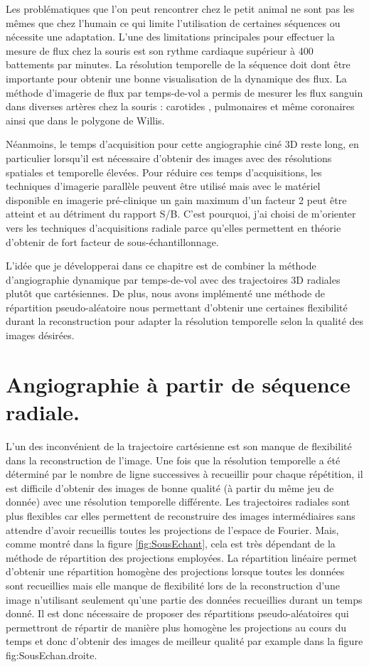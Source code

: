 Les problématiques que l'on peut rencontrer chez le petit animal ne sont pas les mêmes que chez l'humain ce qui limite l'utilisation de certaines séquences ou nécessite une adaptation. L'une des limitations principales pour effectuer la mesure de flux chez la souris est son rythme cardiaque supérieur à 400 battements par minutes. La résolution temporelle de la séquence doit dont être importante pour obtenir une bonne visualisation de la dynamique des flux.
La méthode d'imagerie de flux par temps-de-vol a permis de mesurer les flux sanguin dans diverses artères chez la souris : carotides \cite{Miraux:2006fu}, pulmonaires \cite{Cochet:2013dk} et même coronaires \cite{Cochet:2010ec} ainsi que dans le polygone de Willis.

Néanmoins, le temps d'acquisition pour cette angiographie ciné 3D reste long, en particulier lorsqu'il est nécessaire d'obtenir des images avec des résolutions spatiales et temporelle élevées. Pour réduire ces temps d'acquisitions, les techniques d'imagerie parallèle peuvent être utilisé mais avec le matériel disponible en imagerie pré-clinique un gain maximum d'un facteur 2 peut être atteint et au détriment du rapport S/B. C'est pourquoi, j'ai choisi de m'orienter vers les techniques d'acquisitions radiale parce qu'elles permettent en théorie d'obtenir de fort facteur de sous-échantillonnage.

L'idée que je développerai dans ce chapitre est de combiner la méthode d'angiographie dynamique par temps-de-vol avec des trajectoires 3D radiales plutôt que cartésiennes. De plus, nous avons implémenté une méthode de répartition pseudo-aléatoire nous permettant d'obtenir une certaines flexibilité durant la reconstruction pour adapter la résolution temporelle selon la qualité des images désirées.

\section{Angiographie à partir de séquence radiale.}

L'un des inconvénient de la trajectoire cartésienne est son manque de flexibilité dans la reconstruction de l'image. Une fois que la résolution temporelle a été déterminé par le nombre de ligne successives à recueillir pour chaque répétition, il est difficile d'obtenir des images de bonne qualité (à partir du même jeu de donnée) avec une résolution temporelle différente.
Les trajectoires radiales sont plus flexibles car elles permettent de reconstruire des images intermédiaires sans attendre d'avoir recueillis toutes les projections de l'espace de Fourier. Mais, comme montré dans la figure \ref{fig:SousEchant}, cela est très dépendant de la méthode de répartition des projections employées. La répartition linéaire permet d'obtenir une répartition homogène des projections lorsque toutes les données sont recueillies mais elle manque de flexibilité lors de la reconstruction d'une image n'utilisant seulement qu'une partie des données recueillies durant un temps donné. Il est donc nécessaire de proposer des répartitions pseudo-aléatoires qui permettront de répartir de manière plus homogène les projections au cours du temps et donc d'obtenir des images de meilleur qualité par example dans la figure {fig:SousEchan}.droite.

